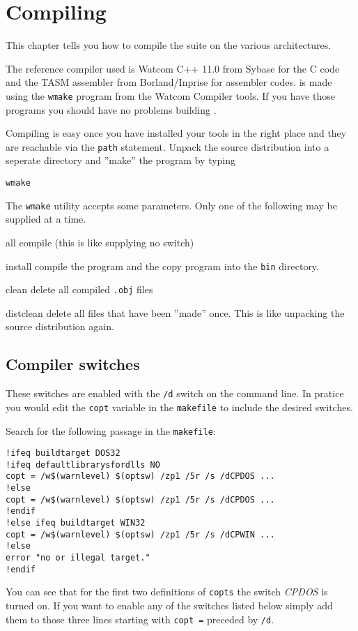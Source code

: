 %
%

\chapter{Compiling \cp}
This chapter tells you how to compile the \cp suite on the various
architectures.

The reference compiler used is Watcom C++ 11.0 from Sybase for the C
code and the TASM assembler from Borland/Inprise for assembler
codes. \cp is made using the \texttt{wmake} program from the Watcom
Compiler tools. If you have those programs you should have no problems
building \cp.

Compiling is easy once you have installed your tools in the right
place and they are reachable via the \texttt{path} statement. Unpack
the source distribution into a seperate directory and ''make'' the
program by typing
\begin{verbatim}
wmake
\end{verbatim}

The \texttt{wmake} utility accepts some parameters. Only one of the
following may be supplied at a time.
\begin{dojlist}
\item[all] compile \cp (this is like supplying no switch)
\item[install] compile the program and the copy program into the \texttt{bin}
directory.
\item[clean] delete all compiled \texttt{.obj} files
\item[distclean] delete all files that have been ''made'' once. This is like
unpacking the source distribution again.
\end{dojlist}

\section{Compiler switches}
These switches are enabled with the \texttt{/d} switch on the command
line.  In pratice you would edit the \texttt{copt} variable in the
\texttt{makefile} to include the desired switches.

\begin{small}
Search for the following passage in the \texttt{makefile}:
\begin{verbatim}
!ifeq buildtarget DOS32
!ifeq defaultlibrarysfordlls NO
copt = /w$(warnlevel) $(optsw) /zp1 /5r /s /dCPDOS ...
!else
copt = /w$(warnlevel) $(optsw) /zp1 /5r /s /dCPDOS ...
!endif
!else ifeq buildtarget WIN32
copt = /w$(warnlevel) $(optsw) /zp1 /5r /s /dCPWIN ...
!else
error "no or illegal target."
!endif
\end{verbatim}

You can see that for the first two definitions of \texttt{copts} the
switch \emph{CPDOS} is turned on. If you want to enable any of the
switches listed below simply add them to those three lines starting
with \texttt{copt =} preceded by \texttt{/d}.
\end{small}

